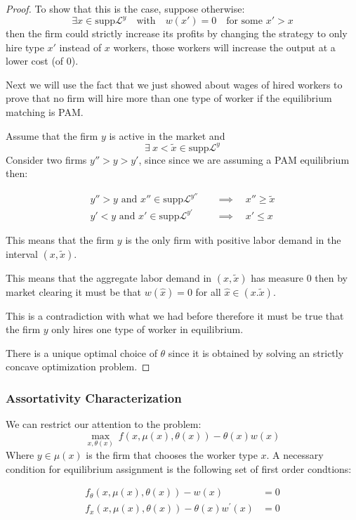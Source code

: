 \documentclass[12pt]{article}
\theoremstyle{definition}
\begin{document}
\begin{proof}
To show that this is the case, suppose otherwise: $$\exists x\in \text{supp} \mathcal{L}^y \quad \text{with} \quad w(x')=0 \quad \text{for some }x'>x$$ then the firm could strictly increase its profits by changing the strategy to only hire type $x'$ instead of $x$ workers, those workers will increase the output at a lower cost (of $0$).


Next we will use the fact that we just showed about wages of hired workers to prove that no firm will hire more than one type of worker if the equilibrium matching is PAM.

Assume that the firm $y$ is active in the market and $$\exists\: x < \tilde{x} \in \text{supp}\mathcal{L}^y$$
Consider two firms $y''>y>y'$, since since we are assuming a PAM equilibrium then:

\begin{align*}
y''>y \text{ and } x''\in\text{supp}\mathcal{L}^{y''} \quad &\implies \quad x''\geq \tilde{x}\\
y'<y \text{ and } x'\in\text{supp}\mathcal{L}^{y'} \quad &\implies \quad x'\leq x
\end{align*}


This means that the firm $y$ is the only firm with positive labor demand in the interval $(x,\tilde{x})$.

This means that the aggregate labor demand in $(x,\tilde{x})$ has measure $0$ then by market clearing it must be that $w(\hat{x})=0$ for all $\hat{x}\in(x.\tilde{x})$.

This is a contradiction with what we had before therefore it must be true that the firm $y$ only hires one type of worker in equilibrium.

There is a unique optimal choice of $\theta$ since it is obtained by solving an strictly concave optimization problem.

\end{proof}

\subsubsection{Assortativity Characterization}

We can restrict our attention to the problem: $$\max_{x,\theta(x)}\:  f(x, \mu(x), \theta(x))-\theta(x) w(x)$$
Where $y\in\mu(x)$ is the firm that chooses the worker type $x$. A necessary condition for equilibrium assignment is the following set of first order condtions:

\begin{subequations}
\label{foc}
\begin{align}
f_{\theta}(x, \mu(x), \theta(x))-w(x) &=0 \label{foc1}\\
f_{x}(x, \mu(x), \theta(x))-\theta(x) w^{\prime}(x) &=0 \label{foc2}
\end{align}
\end{subequations}
\end{document}
